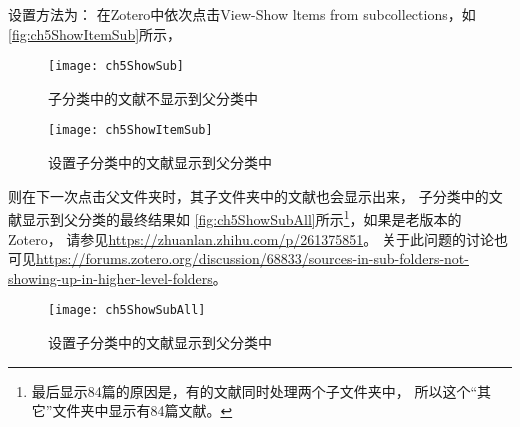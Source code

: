 \documentclass[cn,11pt,chinese]{elegantbook}
\begin{document}
				设置方法为：
				在Zotero中依次点击View-Show ltems from subcollections，如
				\autoref{fig:ch5ShowItemSub}所示，
				\begin{figure}[ht]
					\centering
					\texttt{[image: ch5ShowSub]}
					\caption{子分类中的文献不显示到父分类中}
					\label{fig:ch5ShowSub}
				\end{figure}	
				\begin{figure}[ht]
					\centering
					\texttt{[image: ch5ShowItemSub]}
					\caption{设置子分类中的文献显示到父分类中}
					\label{fig:ch5ShowItemSub}
				\end{figure}
				则在下一次点击父文件夹时，其子文件夹中的文献也会显示出来，
				子分类中的文献显示到父分类的最终结果如
				\autoref{fig:ch5ShowSubAll}所示\footnote{
				最后显示84篇的原因是，有的文献同时处理两个子文件夹中，
				所以这个“其它”文件夹中显示有84篇文献。}，如果是老版本的
				Zotero，
				请参见\url{https://zhuanlan.zhihu.com/p/261375851}。
				关于此问题的讨论也可见\url{https://forums.zotero.org/discussion/68833/sources-in-sub-folders-not-showing-up-in-higher-level-folders}。
				\begin{figure}[ht]
					\centering
					\texttt{[image: ch5ShowSubAll]}
					\caption{设置子分类中的文献显示到父分类中}
					\label{fig:ch5ShowSubAll}
				\end{figure}
\end{document}
